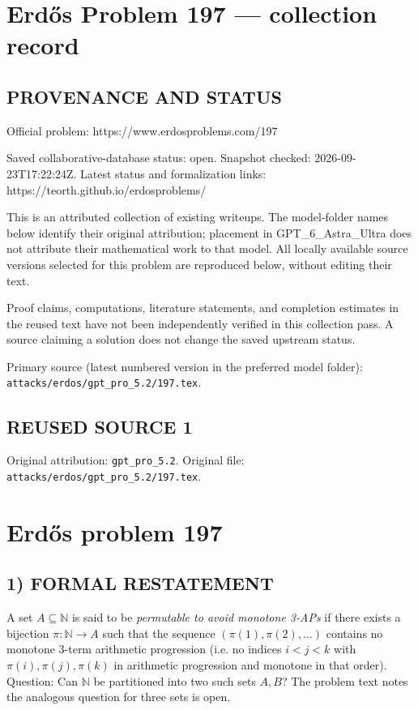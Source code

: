 \section*{Erd\H{o}s Problem 197 --- collection record}

\subsection*{PROVENANCE AND STATUS}
Official problem: https://www.erdosproblems.com/197

Saved collaborative-database status: open.
Snapshot checked: 2026-09-23T17:22:24Z.
Latest status and formalization links: https://teorth.github.io/erdosproblems/

This is an attributed collection of existing writeups. The model-folder names below identify their original attribution; placement in GPT\_6\_Astra\_Ultra does not attribute their mathematical work to that model. All locally available source versions selected for this problem are reproduced below, without editing their text.

Proof claims, computations, literature statements, and completion estimates in the reused text have not been independently verified in this collection pass. A source claiming a solution does not change the saved upstream status.

Primary source (latest numbered version in the preferred model folder): \texttt{attacks/erdos/gpt\_pro\_5.2/197.tex}.

\subsection*{REUSED SOURCE 1}
Original attribution: \texttt{gpt\_pro\_5.2}.
Original file: \texttt{attacks/erdos/gpt\_pro\_5.2/197.tex}.

\section*{Erd\H{o}s problem 197}

\subsection*{1) FORMAL RESTATEMENT}
A set $A\subseteq \mathbb{N}$ is said to be \emph{permutable to avoid monotone 3-APs} if there exists a bijection
$\pi:\mathbb{N}\to A$ such that the sequence $(\pi(1),\pi(2),\dots)$ contains no monotone 3-term arithmetic progression
(i.e. no indices $i<j<k$ with $\pi(i),\pi(j),\pi(k)$ in arithmetic progression and monotone in that order).
Question: Can $\mathbb{N}$ be partitioned into two such sets $A,B$?
The problem text notes the analogous question for three sets is open.

